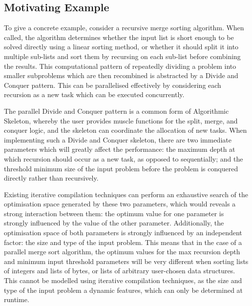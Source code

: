 \subsection{Motivating Example}

To give a concrete example, consider a recursive merge sorting
algorithm. When called, the algorithm determines whether the input
list is short enough to be solved directly using a linear sorting
method, or whether it should split it into multiple sub-lists and sort
them by recursing on each sub-list before combining the results. This
computational pattern of repeatedly dividing a problem into smaller
subproblems which are then recombined is abstracted by a Divide and
Conquer pattern. This can be parallelised effectively by considering
each recursion as a new task which can be executed concurrently.

The parallel Divide and Conquer pattern is a common form of
Algorithmic Skeleton, whereby the user provides muscle functions for
the split, merge, and conquer logic, and the skeleton can coordinate
the allocation of new tasks. When implementing such a Divide and
Conquer skeleton, there are two immediate parameters which will
greatly affect the performance: the maximum depth at which recursion
should occur as a new task, as opposed to sequentially; and the
threshold minimum size of the input problem before the problem is
conquered directly rather than recursively.

Existing iterative compilation techniques can perform an exhaustive
search of the optimisation space generated by these two parameters,
which would reveals a strong interaction between them: the optimum
value for one parameter is strongly influenced by the value of the
other parameter. Additionally, the optimisation space of both
parameters is strongly influenced by an independent factor: the size
and type of the input problem. This means that in the case of a
parallel merge sort algorithm, the optimum values for the max
recursion depth and minimum input threshold parameters will be very
different when sorting lists of integers and lists of bytes, or lists
of arbitrary user-chosen data structures. This cannot be modelled
using iterative compilation techniques, as the size and type of the
input problem a dynamic features, which can only be determined at
runtime.

